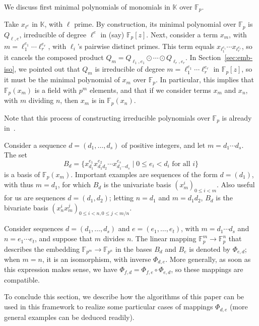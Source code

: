 \documentclass{sig-alternate}
\def\F {\ensuremath{\mathbb{F}}}
\def\K {\ensuremath{\mathbb{K}}}
\newcounter{algo}
\begin{document}
\smallskip{}  We discuss first
minimal polynomials of monomials in $\K$ over $\F_p$.

Take $x_{\ell^{e}}$ in $\K$, with $\ell$ prime. By construction, its
minimal polynomial over $\F_p$ is $Q_{\ell,e}$, irreducible of degree
$\ell^{e}$ in (say) $\F_p[z]$. Next, consider a term $x_m$, with
$m=\ell_1^{e_1}\cdots \ell_r^{e_r}$, with $\ell_i$'s pairwise distinct
primes. This term equals $x_{\ell_1^{e_1}} \cdots x_{\ell_r^{e_r}}$,
so it cancels the composed product $Q_{m}=Q_{\ell_1,e_1} \odot \cdots
\odot Q_{\ell_r,e_r}.$ In Section~\ref{sec:emb-iso}, we pointed out
that $Q_m$ is irreducible of degree $m=\ell_1^{e_1}\cdots
\ell_r^{e_r}$ in $\F_p[z]$, so it must be the minimal polynomial of
$x_m$ over $\F_p$.  In particular, this implies that $\F_p(x_m)$ is a
field with $p^m$ elements, and that if we consider terms $x_m$ and
$x_n$, with $m$ dividing $n$, then $x_m$ is in $\F_p(x_n)$.

Note that this process of constructing irreducible polynomials over
$\F_p$ is already in~\cite{Shoup90,shoup94,couveignes+lercier11}.

\smallskip{}
Consider a sequence $d=(d_1,\dots,d_s)$ of positive integers, and let
$m=d_1 \cdots d_s$. The set
$$B_d = \{ x_{d_1}^{e_1} x_{d_1 d_2}^{e_2} \cdots x_{d_1 \cdots
  d_s}^{e_s} \mid 0 \le e_i < d_i \text{~for all $i$}\}$$ is a basis
of $\F_p(x_m)$. Important examples are sequences of the form $d=(d_1)$,
with thus $m=d_1$, for which $B_d$ is the univariate basis $(x_m^i)_{0
  \le i < m}$. Also useful for us are sequences $d=(d_1,d_2)$; letting
$n=d_1$ and $m=d_1 d_2$, $B_d$ is the bivariate basis $(x_n^i
x_m^j)_{0 \le i < n, 0 \le j < m/n}$.

Consider sequences $d=(d_1,\dots,d_s)$ and $e=(e_1,\dots,e_t)$, with
$m=d_1 \cdots d_s$ and $n=e_1 \cdots e_t$, and suppose that $m$
divides $n$. The linear mapping $\F_p^m \to \F_p^n$ that describes the
embedding $\F_{p^m} \to \F_{p^n}$ in the bases $B_d$ and $B_e$ is
denoted by $\Phi_{e,d}$; when $m=n$, it is an isomorphism, with
inverse $\Phi_{d,e}$. More generally, as soon as this expression makes
sense, we have $\Phi_{f,d} = \Phi_{f,e}\circ \Phi_{e,d}$, so these
mappings are compatible.

To conclude this section, we describe how the algorithms of this paper
can be used in this framework to realize some particular cases of
mappings $\Phi_{d,e}$ (more general examples can be deduced readily).
\end{document}
